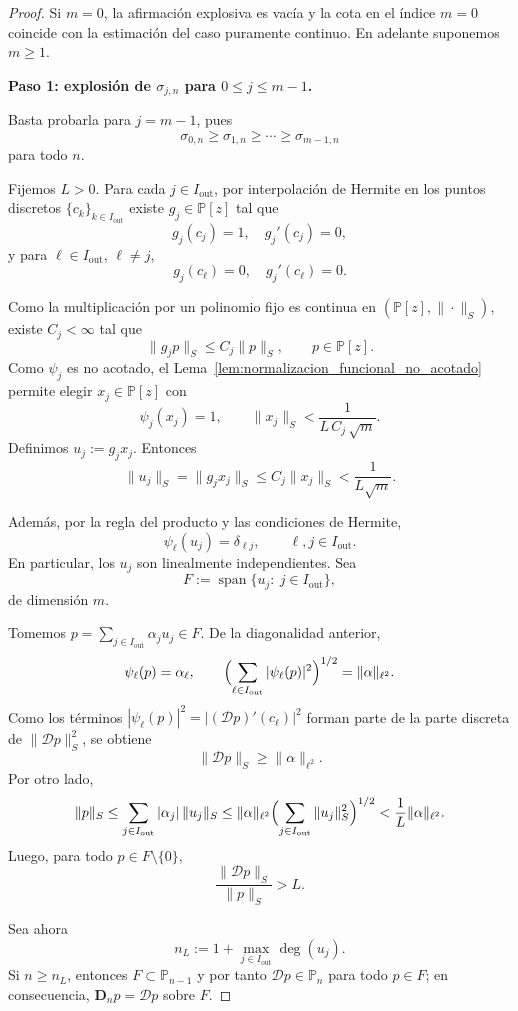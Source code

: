 \begin{proof}
	Si $m=0$, la afirmación explosiva es vacía y la cota en el índice $m=0$ coincide con la
	estimación del caso puramente continuo. En adelante suponemos $m\ge 1$.

	\medskip
	\noindent
	\textbf{Paso 1: explosión de $\sigma_{j,n}$ para $0\le j\le m-1$.}

	Basta probarla para $j=m-1$, pues
	\[
		\sigma_{0,n}\ge\sigma_{1,n}\ge\cdots\ge\sigma_{m-1,n}
	\]
	para todo $n$.

	Fijemos $L>0$. Para cada $j\in I_{\mathrm{out}}$, por interpolación de Hermite en los
	puntos discretos $\{c_k\}_{k\in I_{\mathrm{out}}}$ existe $g_j\in\mathbb P[z]$ tal que
	\[
		g_j(c_j)=1,\quad g_j'(c_j)=0,
	\]
	y para $\ell\in I_{\mathrm{out}}$, $\ell\ne j$,
	\[
		g_j(c_\ell)=0,\quad g_j'(c_\ell)=0.
	\]

	Como la multiplicación por un polinomio fijo es continua en
	$(\mathbb P[z],\|\cdot\|_S)$, existe $C_j<\infty$ tal que
	\[
		\|g_jp\|_S\le C_j\|p\|_S,
		\qquad p\in\mathbb P[z].
	\]
	Como $\psi_j$ es no acotado, el Lema~\ref{lem:normalizacion_funcional_no_acotado}
	permite elegir $x_j\in\mathbb P[z]$ con
	\[
		\psi_j(x_j)=1,
		\qquad
		\|x_j\|_S<\frac{1}{L\,C_j\,\sqrt m}.
	\]
	Definimos $u_j:=g_jx_j$. Entonces
	\[
		\|u_j\|_S=\|g_jx_j\|_S\le C_j\|x_j\|_S<\frac{1}{L\sqrt m}.
	\]

	Además, por la regla del producto y las condiciones de Hermite,
	\[
		\psi_\ell(u_j)=\delta_{\ell j},
		\qquad \ell,j\in I_{\mathrm{out}}.
	\]
	En particular, los $u_j$ son linealmente independientes. Sea
	\[
		F:=\operatorname{span}\{u_j:\ j\in I_{\mathrm{out}}\},
	\]
	de dimensión $m$.

	Tomemos $p=\sum_{j\in I_{\mathrm{out}}}\alpha_ju_j\in F$. De la diagonalidad anterior,
	\[
		\psi_\ell(p)=\alpha_\ell,
		\qquad
		\Bigl(\sum_{\ell\in I_{\mathrm{out}}}|\psi_\ell(p)|^2\Bigr)^{1/2}=\|\alpha\|_{\ell^2}.
	\]
	Como los términos $|\psi_\ell(p)|^2=|(\mathcal Dp)'(c_\ell)|^2$ forman parte de la parte
	discreta de $\|\mathcal Dp\|_S^2$, se obtiene
	\[
		\|\mathcal Dp\|_S\ge \|\alpha\|_{\ell^2}.
	\]
	Por otro lado,
	\[
		\|p\|_S
		\le
		\sum_{j\in I_{\mathrm{out}}}|\alpha_j|\,\|u_j\|_S
		\le
		\|\alpha\|_{\ell^2}\Bigl(\sum_{j\in I_{\mathrm{out}}}\|u_j\|_S^2\Bigr)^{1/2}
		<
		\frac1L\|\alpha\|_{\ell^2}.
	\]
	Luego, para todo $p\in F\setminus\{0\}$,
	\[
		\frac{\|\mathcal Dp\|_S}{\|p\|_S}>L.
	\]

	Sea ahora
	\[
		n_L:=1+\max_{j\in I_{\mathrm{out}}}\deg(u_j).
	\]
	Si $n\ge n_L$, entonces $F\subset\mathbb P_{n-1}$ y por tanto
	$\mathcal Dp\in\mathbb P_n$ para todo $p\in F$; en consecuencia,
	$\mathbf D_n p=\mathcal Dp$ sobre $F$.


\end{proof}
